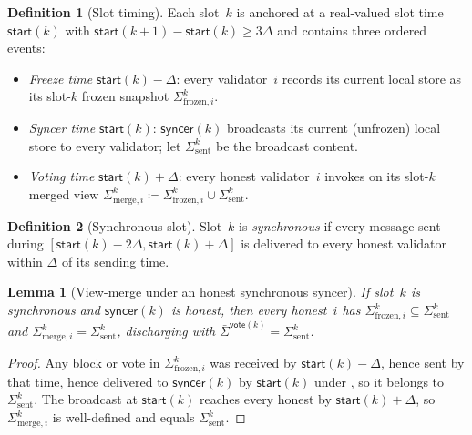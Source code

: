 \documentclass{article}
\newcommand{\syncer}{\mathsf{syncer}}
\newcommand{\start}{\mathsf{start}}
\newcommand{\vote}{\mathsf{vote}}
\newcommand{\comm}[1]{\bar{#1}}
\theoremstyle{plain}
\newtheorem{lemma}{Lemma}
\theoremstyle{definition}
\newtheorem{definition}{Definition}
\theoremstyle{remark}
\begin{document}
\begin{definition}[Slot timing]\label{rev:def:slot-timing}
Each slot~$k$ is anchored at a real-valued slot time $\start(k)$ with $\start(k+1) - \start(k) \geq 3\Delta$ and contains three ordered events:
\begin{itemize}
  \item \emph{Freeze time} $\start(k) - \Delta$: every validator~$i$ records its current local store as its slot-$k$ frozen snapshot $\Sigma^k_{\mathrm{frozen},i}$.
  \item \emph{Syncer time} $\start(k)$: $\syncer(k)$ broadcasts its current (unfrozen) local store to every validator; let $\Sigma^k_{\mathrm{sent}}$ be the broadcast content.
  \item \emph{Voting time} $\start(k) + \Delta$: every honest validator~$i$ invokes  on its slot-$k$ merged view $\Sigma^k_{\mathrm{merge},i} \coloneqq \Sigma^k_{\mathrm{frozen},i} \cup \Sigma^k_{\mathrm{sent}}$.
\end{itemize}
\end{definition}

\begin{definition}[Synchronous slot]\label{rev:def:synchrony-window}
Slot~$k$ is \emph{synchronous} if every message sent during $[\start(k) - 2\Delta, \start(k) + \Delta]$ is delivered to every honest validator within $\Delta$ of its sending time.
\end{definition}

\begin{lemma}[View-merge under an honest synchronous syncer]\label{rev:lem:view-merge}
If slot~$k$ is synchronous and $\syncer(k)$ is honest, then every honest~$i$ has $\Sigma^k_{\mathrm{frozen},i} \subseteq \Sigma^k_{\mathrm{sent}}$ and $\Sigma^k_{\mathrm{merge},i} = \Sigma^k_{\mathrm{sent}}$, discharging  with $\comm{\Sigma}^{\vote(k)} = \Sigma^k_{\mathrm{sent}}$.
\end{lemma}

\begin{proof}
Any block or vote in $\Sigma^k_{\mathrm{frozen},i}$ was received by $\start(k) - \Delta$, hence sent by that time, hence delivered to $\syncer(k)$ by $\start(k)$ under , so it belongs to $\Sigma^k_{\mathrm{sent}}$.
The broadcast at $\start(k)$ reaches every honest by $\start(k) + \Delta$, so $\Sigma^k_{\mathrm{merge},i}$ is well-defined and equals $\Sigma^k_{\mathrm{sent}}$.
\end{proof}
\end{document}
